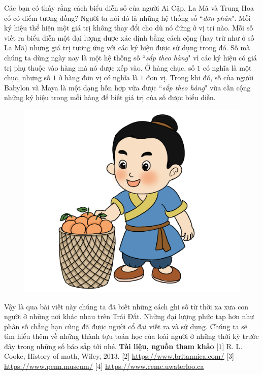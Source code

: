 \begin{multicols}{2}
	\vskip 0.1cm
	Các bạn có thấy rằng cách biểu diễn số của người Ai Cập, La Mã và Trung Hoa cổ có điểm tương đồng? Người ta nói đó là những hệ thống số ``\textit{đơn phân}". Mỗi ký hiệu thể hiện một giá trị không thay đổi cho dù nó đứng ở vị trí nào. Mỗi số viết ra biểu diễn một đại lượng được xác định bằng cách  cộng (hay trừ như ở số La Mã) những giá trị tương ứng với các ký hiệu được sử dụng trong đó. Số mà chúng ta dùng ngày nay là một hệ thống số ``\textit{sắp theo hàng}" vì các ký hiệu có giá trị phụ thuộc vào hàng mà nó được xếp vào. Ở hàng chục, số $1$ có nghĩa là một chục, nhưng số $1$ ở hàng đơn vị có nghĩa là $1$ đơn vị. Trong khi đó, số của người Babylon và Maya là một dạng hỗn hợp vừa được ``\textit{sắp theo hàng}" vừa cần cộng những ký hiệu trong mỗi hàng để biết giá trị của số được biểu diễn.
	\begin{figure}[H]
		\centering
		\vspace*{-5pt}
		\captionsetup{labelformat= empty, justification=centering}
		\includegraphics[width=0.85\linewidth]{20.12-pi.3}
		\vspace*{-10pt}
	\end{figure}
	Vậy là qua bài viết này chúng ta đã biết những cách ghi số  từ thời xa xưa con người ở những nơi khác nhau trên Trái Đất. Những đại lượng phức tạp hơn như phân số chẳng hạn cũng đã được người cổ đại viết ra và sử dụng. Chúng ta sẽ tìm hiểu thêm về những thành tựu toán học của loài người ở những thời kỳ trước đây trong những số báo sắp tới nhé. 
	\vskip 0.1cm
	\textbf{\color{toancuabi}Tài liệu, nguồn tham khảo}
	\vskip 0.1cm
	[$1$] R. L. Cooke, History of math, Wiley, $2013$.
	\vskip 0.1cm
	[$2$] \url{https://www.britannica.com/}
	\vskip 0.1cm
	[$3$] \url{https://www.penn.museum/}
	\vskip 0.1cm
	[$4$] \url{https://www.cemc.uwaterloo.ca}
\end{multicols}
